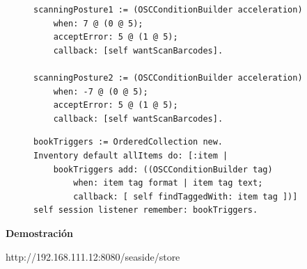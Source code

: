 \documentclass[
paper=128mm:96mm, %
fontsize=11pt, %
pagesize, %
parskip=half-, %
]{scrartcl} %
\theoremstyle{mythmstyle} %
\begin{document}
\clearpage

\begin{figure}[ht!]
\centering
\begin{verbatim}
scanningPosture1 := (OSCConditionBuilder acceleration)
    when: 7 @ (0 @ 5);
    acceptError: 5 @ (1 @ 5);
    callback: [self wantScanBarcodes].

scanningPosture2 := (OSCConditionBuilder acceleration)
    when: -7 @ (0 @ 5);
    acceptError: 5 @ (1 @ 5);
    callback: [self wantScanBarcodes].
\end{verbatim}
\end{figure}

\clearpage

\begin{figure}[ht!]
\centering
\begin{verbatim}
bookTriggers := OrderedCollection new.
Inventory default allItems do: [:item | 
    bookTriggers add: ((OSCConditionBuilder tag)
        when: item tag format | item tag text;
        callback: [ self findTaggedWith: item tag ])]
self session listener remember: bookTriggers.
\end{verbatim}
\end{figure}

\clearpage
\thispagestyle{empty} %

\begin{flushright}
\vspace{0.6cm}
\color{white}\sffamily
{\bfseries\LARGE Demostración\par} %
\vfill
\end{flushright}
http://192.168.111.12:8080/seaside/store

\clearpage
\end{document}
